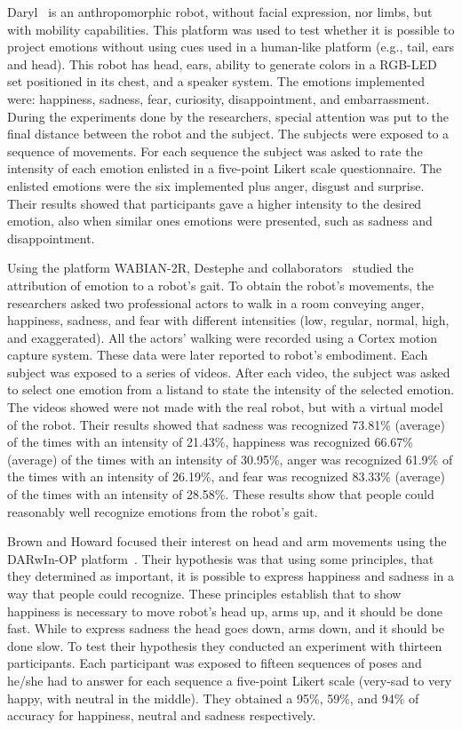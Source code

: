 Daryl~\cite{Arras2012} is an anthropomorphic robot, without facial expression, nor limbs, but with mobility capabilities. This platform was used to test whether it is possible to project emotions without using cues used in a human-like platform (e.g., tail, ears and head). This robot has head, ears, ability to generate colors in a RGB-LED set positioned in its chest, and a speaker system. The emotions implemented were: happiness, sadness, fear, curiosity, disappointment, and embarrassment. During the experiments done by the researchers, special attention was put to the final distance between the robot and the subject. The subjects were exposed to a sequence of movements. For each sequence the subject was asked to rate the intensity of each emotion enlisted in a five-point Likert scale questionnaire. The enlisted emotions were the six implemented plus anger, disgust and surprise. Their results showed that participants gave a higher intensity to the desired emotion, also when similar ones emotions were presented, such as sadness and disappointment. 

Using the platform WABIAN-2R, Destephe and collaborators~\cite{Destephe2013b} studied the attribution of emotion to a robot's gait. To obtain the robot's movements, the researchers asked two professional actors to walk in a room conveying anger, happiness, sadness, and fear with different intensities (low, regular, normal, high, and exaggerated). All the actors' walking were recorded using a Cortex motion capture system. These data were later reported to robot's embodiment. Each subject was exposed to a series of videos. After each video, the subject was asked to select one emotion from a listand to state the intensity of the selected emotion. The videos showed were not made with the real robot, but with a virtual model of the robot. Their results showed that sadness was recognized 73.81\% (average) of the times with an intensity of 21.43\%, happiness was recognized 66.67\% (average) of the times with an intensity of 30.95\%, anger was recognized 61.9\% of the times with an intensity of 26.19\%, and fear was recognized 83.33\% (average) of the times with an intensity of 28.58\%. These results show that people could reasonably well recognize emotions from the robot's gait.

Brown and Howard focused their interest on head and arm movements using the DARwIn-OP platform~\cite{Brown2014}. Their hypothesis was that using some principles, that they determined as important, it is possible to express happiness and sadness in a way that people could recognize. These principles establish that to show happiness is necessary to move robot's head up, arms up, and it should be done fast. While to express sadness the head goes down, arms down, and it should be done slow. To test their hypothesis they conducted an experiment with thirteen participants. Each participant was exposed to fifteen sequences of poses and he/she had to answer for each sequence a five-point Likert scale (very-sad to very happy, with neutral in the middle). They obtained a 95\%, 59\%, and 94\% of accuracy for happiness, neutral and sadness respectively. 
 
